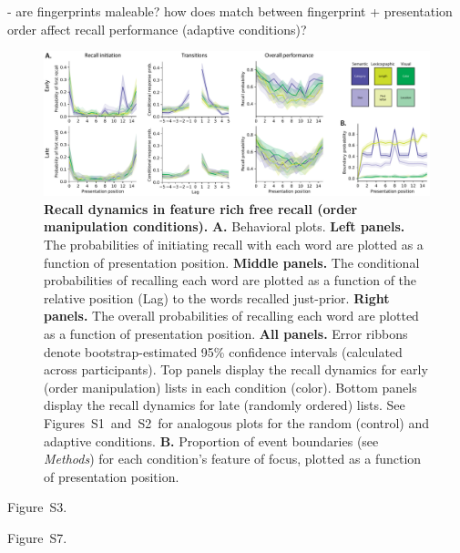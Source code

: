 \documentclass[11pt]{article}
\newcommand{\dynamicsRandom}{S1}
\newcommand{\dynamicsAdaptive}{S2}
\newcommand{\accuracyByList}{S3}
\newcommand{\recallInit}{S7}
\begin{document}
- are fingerprints maleable?  how does match between fingerprint + presentation order affect recall performance (adaptive conditions)?




\begin{figure}[tp] \centering
\includegraphics[width=\textwidth]{figures/recall_dynamics}

\caption{\textbf{Recall dynamics in feature rich free recall (order
manipulation conditions).} \textbf{A.} Behavioral plots. \textbf{Left panels.}
The probabilities of initiating recall with each word are plotted as a function
of presentation position. \textbf{Middle panels.} The conditional probabilities
of recalling each word are plotted as a function of the relative position (Lag)
to the words recalled just-prior. \textbf{Right panels.} The overall
probabilities of recalling each word are plotted as a function of presentation
position. \textbf{All panels.} Error ribbons denote bootstrap-estimated 95\%
confidence intervals (calculated across participants). Top panels display the
recall dynamics for early (order manipulation) lists in each condition (color).
Bottom panels display the recall dynamics for late (randomly ordered) lists.
See Figures~\dynamicsRandom~and~\dynamicsAdaptive~for analogous plots for the
random (control) and adaptive conditions. \textbf{B.} Proportion of event
boundaries (see \textit{Methods}) for each condition's feature of focus,
plotted as a function of presentation position.}

    \label{fig:recall-dynamics}
\end{figure}

Figure~\accuracyByList.

Figure~\recallInit.
\end{document}

